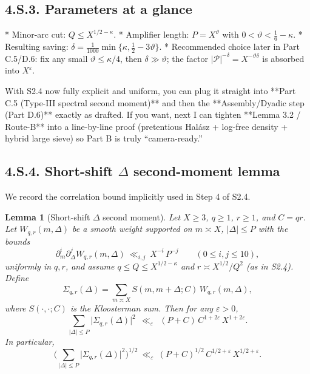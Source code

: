 \documentclass[11pt]{article}
\newtheorem{lemma}{Lemma}[section]
\theoremstyle{definition}
\theoremstyle{remark}
\begin{document}
\subsection*{4.S.3. Parameters at a glance}

* Minor-arc cut: $Q\le X^{1/2-\kappa}$.
* Amplifier length: $P=X^\vartheta$ with $0<\vartheta<\tfrac16-\kappa$.
* Resulting saving: $\delta=\frac1{1000}\min\{\kappa,\tfrac12-3\vartheta\}$.
* Recommended choice later in Part C.5/D.6: fix any small $\vartheta\le \kappa/4$, then $\delta\gg\vartheta$; the factor $|\mathcal P|^{-\delta}=X^{-\vartheta\delta}$ is absorbed into $X^\varepsilon$.

With S2.4 now fully explicit and uniform, you can plug it straight into **Part C.5 (Type-III spectral second moment)** and then the **Assembly/Dyadic step (Part D.6)** exactly as drafted. If you want, next I can tighten **Lemma 3.2 / Route-B** into a line-by-line proof (pretentious Halász + log-free density + hybrid large sieve) so Part B is truly “camera-ready.”

\subsection*{4.S.4. Short-shift $\Delta$ second-moment lemma}

We record the correlation bound implicitly used in Step 4 of S2.4.

\begin{lemma}[Short-shift $\Delta$ second moment]\label{lem:delta-second-moment}
Let $X\ge 3$, $q\ge 1$, $r\ge 1$, and $C=qr$. Let $W_{q,r}(m,\Delta)$ be a smooth weight supported on $m\asymp X$, $|\Delta|\le P$ with the bounds
\[
\partial_m^{i}\partial_\Delta^{j} W_{q,r}(m,\Delta)\ \ll_{i,j}\ X^{-i}\,P^{-j}
\qquad (0\le i,j\le 10),
\]
uniformly in $q,r$, and assume $q\le Q\le X^{1/2-\kappa}$ and $r\asymp X^{1/2}/Q^2$ (as in S2.4). Define
\[
\Sigma_{q,r}(\Delta)=\sum_{m\asymp X} S(m,m+\Delta;C)\,W_{q,r}(m,\Delta),
\]
where $S(\cdot,\cdot;C)$ is the Kloosterman sum. Then for any $\varepsilon>0$,
\[
\sum_{|\Delta|\le P} \big|\Sigma_{q,r}(\Delta)\big|^2\ \ \ll_{\varepsilon}\ \ (P+C)\,C^{1+2\varepsilon}\,X^{1+2\varepsilon}.
\]
In particular,
\[
\Big(\sum_{|\Delta|\le P} \big|\Sigma_{q,r}(\Delta)\big|^2\Big)^{1/2}
\ \ll_{\varepsilon}\ (P+C)^{1/2}\,C^{1/2+\varepsilon}\,X^{1/2+\varepsilon}.
\]
\end{lemma}
\end{document}
